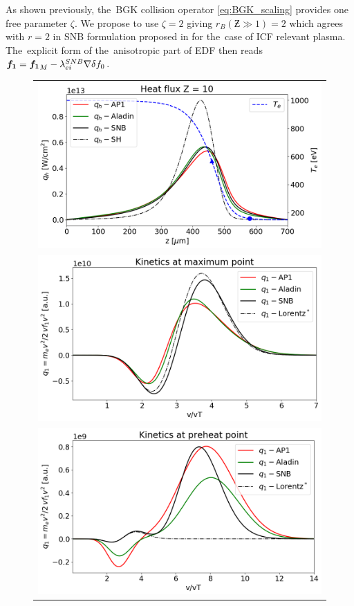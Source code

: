 As shown previously, the~BGK collision operator \eqref{eq:BGK_scaling}
provides one free parameter $\zeta$.
We propose to use $\zeta = 2$ giving $r_B(\Zbar\gg1) = 2$ which agrees 
with $r=2$ in SNB formulation proposed in \cite{Brodrick_PoP2017} 
for the~case of ICF relevant plasma. The~explicit form of the~anisotropic 
part of EDF then reads ${\boldsymbol{f_1}} = {\boldsymbol{f_1}}_M - \lambda_{ei}^{SNB}\nabla\delta f_0$.

\begin{figure}[htb]
  \begin{center}
    \begin{tabular}{c}
      \includegraphics[width=\figscale\textwidth]{../VFPdata/C7_Aladin_case3_heatflux.png} \\
      \includegraphics[width=\figscale\textwidth]{../VFPdata/C7_Aladin_case3_kinetics.png} \\
      \includegraphics[width=\figscale\textwidth]{../VFPdata/C7_Aladin_case3_nonlocal_kinetics.png}  

\end{tabular}
\end{center}
\end{figure}
